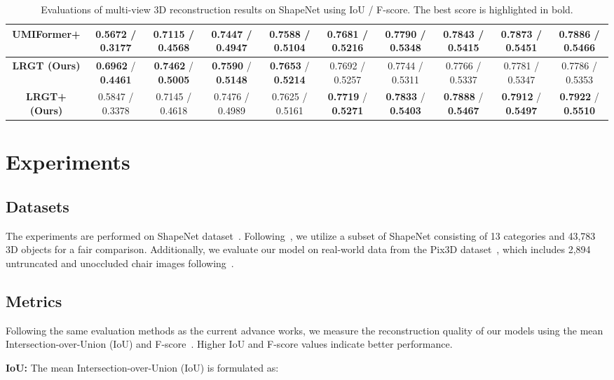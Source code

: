 \documentclass[10pt,twocolumn,letterpaper]{article}
\begin{document}
\begin{table*}[]
{\begin{tabular}{c|ccccccccc}
        \textbf{UMIFormer+} & 0.5672 / 0.3177 & 0.7115 / 0.4568 & 0.7447 / 0.4947 & 0.7588 / 0.5104 & 0.7681 / 0.5216 & 0.7790 / 0.5348 & 0.7843 / 0.5415 & 0.7873 / 0.5451 & 0.7886 / 0.5466 \\ \hline 
        \textbf{LRGT (Ours)} & \textbf{0.6962} / \textbf{0.4461} & \textbf{0.7462} / \textbf{0.5005} & \textbf{0.7590} / \textbf{0.5148} & \textbf{0.7653} / \textbf{0.5214} & 0.7692 / 0.5257 & 0.7744 / 0.5311 & 0.7766 / 0.5337 & 0.7781 / 0.5347 & 0.7786 / 0.5353 \\
        \textbf{LRGT+ (Ours)} & 0.5847 / 0.3378 & 0.7145 / 0.4618 & 0.7476 / 0.4989 & 0.7625 / 0.5161 & \textbf{0.7719} / \textbf{0.5271} & \textbf{0.7833} / \textbf{0.5403} & \textbf{0.7888} / \textbf{0.5467} & \textbf{0.7912} / \textbf{0.5497} & \textbf{0.7922} / \textbf{0.5510} \\ \hline
	\end{tabular}}
	\caption{Evaluations of multi-view 3D reconstruction results on ShapeNet using IoU / F-score. The best score is highlighted in bold.}
\label{total_result}
\end{table*}

\section{Experiments}
\subsection{Datasets}
The experiments are performed on ShapeNet dataset~\cite{chang2015shapenet}. Following~\cite{choy20163d}, we utilize a subset of ShapeNet consisting of 13 categories and 43,783 3D objects for a fair comparison. Additionally, we evaluate our model on real-world data from the Pix3D dataset~\cite{sun2018pix3d}, which includes 2,894 untruncated and unoccluded chair images following~\cite{xie2019pix2vox,xie2020pix2vox++}.

\subsection{Metrics} Following the same evaluation methods as the current advance works, we measure the reconstruction quality of our models using the mean Intersection-over-Union (IoU) and F-score~\cite{xie2020pix2vox++}. Higher IoU and F-score values indicate better performance.

\textbf{IoU:} The mean Intersection-over-Union (IoU) is formulated as:
\end{document}
